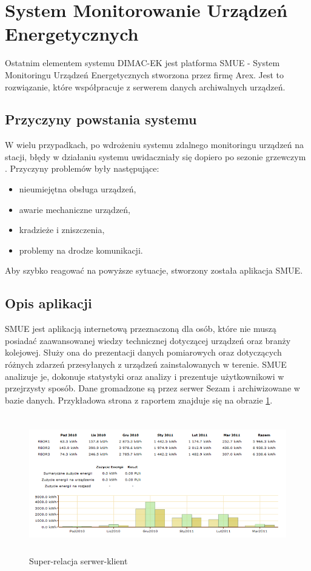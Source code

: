 \section{System Monitorowanie Urządzeń Energetycznych}
Ostatnim elementem systemu DIMAC-EK jest platforma SMUE - System Monitoringu Urządzeń Energetycznych stworzona przez firmę Arex. Jest to rozwiązanie, które współpracuje z serwerem danych archiwalnych urządzeń\cite{dimacek-wytyczne}. 

\subsection{Przyczyny powstania systemu}
W wielu przypadkach, po wdrożeniu systemu zdalnego monitoringu urządzeń na stacji, błędy w działaniu systemu uwidaczniały się dopiero po sezonie grzewczym \cite{dimacek-wytyczne}. Przyczyny problemów były następujące:
\begin{itemize}
\item nieumiejętna obsługa urządzeń,
\item awarie mechaniczne urządzeń,
\item kradzieże i zniszczenia,
\item problemy na drodze komunikacji.
\end{itemize}

Aby szybko reagować na powyższe sytuacje, stworzony została aplikacja SMUE.

\subsection{Opis aplikacji}
SMUE jest aplikacją internetową przeznaczoną dla osób, które nie muszą posiadać zaawansowanej wiedzy technicznej dotyczącej urządzeń oraz branży kolejowej\cite{dimacek-wytyczne}. Służy ona do prezentacji danych pomiarowych oraz dotyczących różnych zdarzeń przesyłanych z urządzeń zainstalowanych w terenie. SMUE analizuje je, dokonuje statystyki oraz analizy i prezentuje użytkownikowi w przejrzysty sposób. Dane gromadzone są  przez serwer Sezam i archiwizowane w bazie danych. Przykładowa strona z raportem znajduje się na obrazie \ref{fig:smue}.\\

\begin{figure}[h]
		\includegraphics[height=60mm]{./img/smue.png}
		\caption{Super-relacja serwer-klient}
		\label{fig:smue}
\end{figure}

